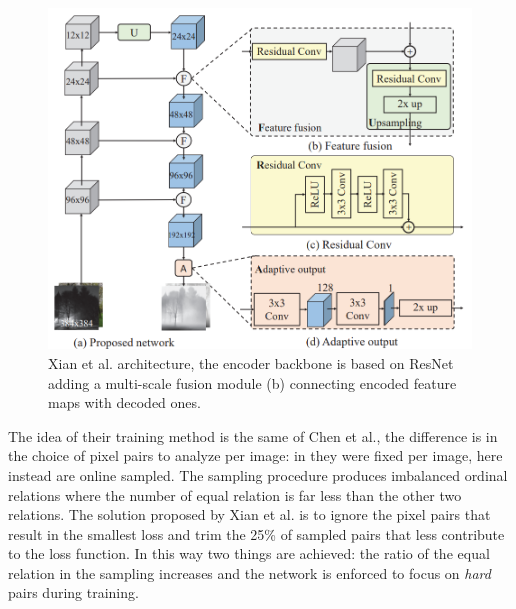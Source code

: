 \begin{figure}
\centering
\includegraphics[scale=0.4]{figs/ReDWeb_architecture}
\caption{Xian et al. \cite{ReDWeb} architecture, the encoder backbone is based on ResNet \cite{ResNet} adding a multi-scale fusion module (b) connecting encoded feature maps with decoded ones. \label{fig:ReDWeb_architecture}}
\end{figure}

The idea of their training method is the same of Chen et al., the difference is in the choice of pixel pairs to analyze per image: in \cite{DIW} they were fixed per image, here instead are online sampled.
The sampling procedure produces imbalanced ordinal relations where the number of equal relation is far less than the other two relations.
The solution proposed by Xian et al. is to ignore the pixel pairs that result in the smallest loss and trim the 25\% of sampled pairs that less contribute to the loss function.
In this way two things are achieved: the ratio of the equal relation in the sampling increases and the network is enforced to focus on \textit{hard} pairs during training.

